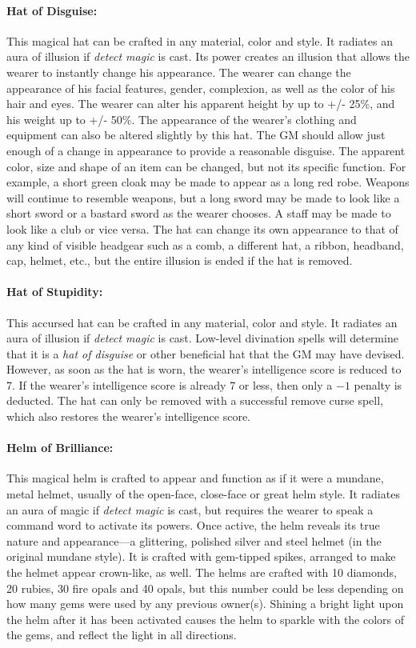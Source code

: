 \begin{multicols}{2}
\paragraph{Hat of Disguise:} This magical hat can be crafted in any material, color and style.  It radiates an aura of illusion if \textit{detect magic} is cast.  Its power creates an illusion that allows the wearer to instantly change his appearance.  The wearer can change the appearance of his facial features, gender, complexion, as well as the color of his hair and eyes.  The wearer can alter his apparent height by up to +/- 25\%, and his weight up to  +/- 50\%.  The appearance of the wearer's clothing and equipment can also be altered slightly by this hat.  The GM should allow just enough of a change in appearance to provide a reasonable disguise.  The apparent color, size and shape of an item can be changed, but not its specific function.  For example, a short green cloak may be made to appear as a long red robe.  Weapons will continue to resemble weapons, but a long sword may be made to look like a short sword or a bastard sword as the wearer chooses.  A staff may be made to look like a club or vice versa.  The hat can change its own appearance to that of any kind of visible headgear such as a comb, a different hat, a ribbon, headband, cap, helmet, etc., but the entire illusion is ended if the hat is removed.

\paragraph{Hat of Stupidity:} This accursed hat can be crafted in any material, color and style.  It radiates an aura of illusion if \textit{detect magic} is cast.  Low-level divination spells will determine that it is a \textit{hat of disguise} or other beneficial hat that the GM may have devised.  However, as soon as the hat is worn, the wearer's intelligence score is reduced to 7.  If the wearer's intelligence score is already 7 or less, then only a $-1$ penalty is deducted.  The hat can only be removed with a successful remove curse spell, which also restores the wearer's intelligence score.

\paragraph{Helm of Brilliance:}  This magical helm is crafted to appear and function as if it were a mundane, metal helmet, usually of the open-face, close-face or great helm style.  It radiates an aura of magic if \textit{detect magic} is cast, but requires the wearer to speak a command word to activate its powers.  Once active, the helm reveals its true nature and appearance---a glittering, polished silver and steel helmet (in the original mundane style).  It is crafted with gem-tipped spikes, arranged to make the helmet appear crown-like, as well.  The helms are crafted with 10 diamonds, 20 rubies, 30 fire opals and 40 opals, but this number could be less depending on how many gems were used by any previous owner(s).  Shining a bright light upon the helm after it has been activated causes the helm to sparkle with the colors of the gems, and reflect the light in all directions.


\end{multicols}
